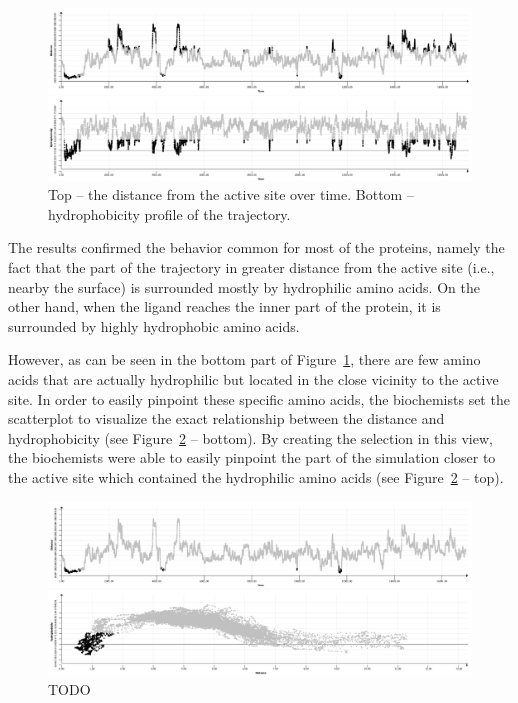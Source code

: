 \documentclass[twocolumn]{bmcart}%
\begin{document}
\begin{figure}[htb]
	\centering
  \includegraphics[width=0.95\linewidth]{img/case_hydro_distance.png}
  \caption{\label{fig:case_hydro_distance} {Top -- the distance from the active site over time. Bottom -- hydrophobicity profile of the trajectory.}}
\end{figure} 

The results confirmed the behavior common for most of the proteins, namely the fact that the part of the trajectory in greater distance from the active site (i.e., nearby the surface) is surrounded mostly by hydrophilic amino acids.
On the other hand, when the ligand reaches the inner part of the protein, it is surrounded by highly hydrophobic amino acids.

However, as can be seen in the bottom part of Figure~\ref{fig:case_hydro_distance}, there are few amino acids that are actually hydrophilic but located in the close vicinity to the active site. 
In order to easily pinpoint these specific amino acids, the biochemists set the scatterplot to visualize the exact relationship between the distance and hydrophobicity (see Figure~\ref{fig:case_hydro_distance_2} -- bottom).
By creating the selection in this view, the biochemists were able to easily pinpoint the part of the simulation closer to the active site which contained the hydrophilic amino acids (see Figure~\ref{fig:case_hydro_distance_2} -- top).

\begin{figure}[htb]
	\centering
  \includegraphics[width=0.95\linewidth]{img/case_hydro_distance_2.png}
  \caption{\label{fig:case_hydro_distance_2} {\color{red}TODO}}
\end{figure}
\end{document}
